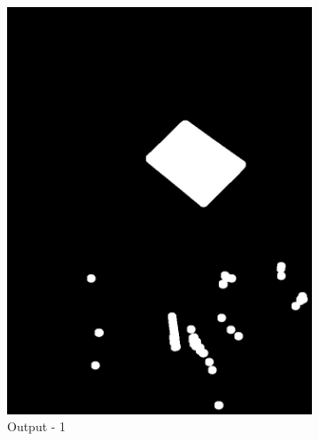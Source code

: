 \documentclass[paper=a4, fontsize=10pt]{scrartcl} %
\numberwithin{equation}{section} %
\numberwithin{figure}{section} %
\begin{document}
\begin{figure}[!ht]
	\centering
	\begin{subfigure}[b]{0.275\textwidth}
		\includegraphics[width=\textwidth]{s_dilation_01}
		\caption{Output - 1}
		\label{fig:s_dilation_output_01}
	\end{subfigure}
	~ 
	\begin{subfigure}[b]{0.275\textwidth}

\end{subfigure}
\end{figure}
\end{document}
